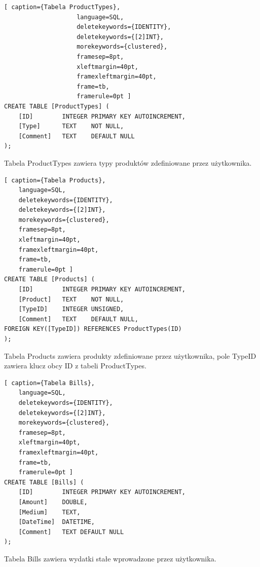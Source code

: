 \documentclass[a4paper,10pt, twoside]{report}
\begin{document}

\begin{minipage}{\textwidth}
\begin{lstlisting}[ caption={Tabela ProductTypes},
                    language=SQL,
                    deletekeywords={IDENTITY},
                    deletekeywords={[2]INT},
                    morekeywords={clustered},
                    framesep=8pt,
                    xleftmargin=40pt,
                    framexleftmargin=40pt,
                    frame=tb,
                    framerule=0pt ]
CREATE TABLE [ProductTypes] (
    [ID] 		INTEGER PRIMARY KEY AUTOINCREMENT,
    [Type] 		TEXT 	NOT NULL,
    [Comment] 	TEXT 	DEFAULT NULL
);
\end{lstlisting}
{Tabela ProductTypes zawiera typy produktów zdefiniowane przez użytkownika.}
\end{minipage}


\begin{minipage}{\textwidth}
\begin{lstlisting}[ caption={Tabela Products},
    language=SQL,
    deletekeywords={IDENTITY},
    deletekeywords={[2]INT},
    morekeywords={clustered},
    framesep=8pt,
    xleftmargin=40pt,
    framexleftmargin=40pt,
    frame=tb,
    framerule=0pt ]
CREATE TABLE [Products] (
    [ID]        INTEGER PRIMARY KEY AUTOINCREMENT,
    [Product]   TEXT    NOT NULL,
    [TypeID]	INTEGER UNSIGNED, 
    [Comment] 	TEXT    DEFAULT NULL,
FOREIGN KEY([TypeID]) REFERENCES ProductTypes(ID)
);
\end{lstlisting}
{Tabela Products zawiera produkty zdefiniowane przez użytkownika, pole TypeID 
zawiera klucz obcy ID z tabeli ProductTypes.}
\end{minipage}

\begin{minipage}{\textwidth}
\begin{lstlisting}[ caption={Tabela Bills},
    language=SQL,
    deletekeywords={IDENTITY},
    deletekeywords={[2]INT},
    morekeywords={clustered},
    framesep=8pt,
    xleftmargin=40pt,
    framexleftmargin=40pt,
    frame=tb,
    framerule=0pt ]
CREATE TABLE [Bills] (
    [ID]        INTEGER PRIMARY KEY AUTOINCREMENT,
    [Amount]    DOUBLE,
    [Medium]    TEXT,
    [DateTime]  DATETIME,
    [Comment]   TEXT DEFAULT NULL
);
\end{lstlisting}
{Tabela Bills zawiera wydatki stałe wprowadzone przez użytkownika.}
\end{minipage}
\end{document}
